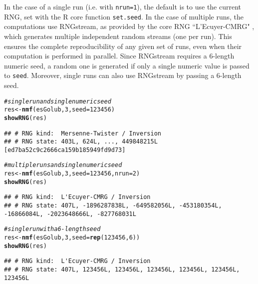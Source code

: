 \documentclass[a4paper]{article}\usepackage[]{graphicx}\usepackage[]{color}
\makeatletter
\newcommand{\hlnum}[1]{\textcolor[rgb]{0.686,0.059,0.569}{#1}}%
\newcommand{\hlcom}[1]{\textcolor[rgb]{0.678,0.584,0.686}{\textit{#1}}}%
\newcommand{\hlstd}[1]{\textcolor[rgb]{0.345,0.345,0.345}{#1}}%
\newcommand{\hlkwb}[1]{\textcolor[rgb]{0.69,0.353,0.396}{#1}}%
\newcommand{\hlkwc}[1]{\textcolor[rgb]{0.333,0.667,0.333}{#1}}%
\newcommand{\hlkwd}[1]{\textcolor[rgb]{0.737,0.353,0.396}{\textbf{#1}}}%
\newenvironment{kframe}{%
 \def\at@end@of@kframe{}%
 \ifinner\ifhmode%
  \def\at@end@of@kframe{\end{minipage}}%
  \begin{minipage}{\columnwidth}%
 \fi\fi%
 \def\FrameCommand##1{\hskip\@totalleftmargin \hskip-\fboxsep
 \colorbox{shadecolor}{##1}\hskip-\fboxsep
     \hskip-\linewidth \hskip-\@totalleftmargin \hskip\columnwidth}%
 \MakeFramed {\advance\hsize-\width
   \@totalleftmargin\z@ \linewidth\hsize
   \@setminipage}}%
 {\par\unskip\endMakeFramed%
 \at@end@of@kframe}
\newenvironment{knitrout}{}{} %
\let\code=\texttt
\renewcommand{\cite}[1]{\parencite{#1}}
\makeatother
\begin{document}
In the case of a single run (i.e. with \code{nrun=1}), the default is to use the current RNG, set with the R core function \code{set.seed}. 
In the case of multiple runs, the computations use RNGstream, as provided by the core RNG ``L'Ecuyer-CMRG" \cite{Lecuyer2002}, which generates multiple independent random streams (one per run).
This ensures the complete reproducibility of any given set of runs, even when their computation is performed in parallel.
Since RNGstream requires a 6-length numeric seed, a random one is generated if only a single numeric value is passed to \code{seed}.
Moreover, single runs can also use RNGstream by passing a 6-length seed.
  
\begin{knitrout}
\color{fgcolor}\begin{kframe}
\begin{alltt}
\hlcom{# single run and single numeric seed}
\hlstd{res} \hlkwb{<-} \hlkwd{nmf}\hlstd{(esGolub,} \hlnum{3}\hlstd{,} \hlkwc{seed} \hlstd{=} \hlnum{123456}\hlstd{)}
\hlkwd{showRNG}\hlstd{(res)}
\end{alltt}
\begin{verbatim}
## # RNG kind:  Mersenne-Twister / Inversion 
## # RNG state: 403L, 624L, ..., 449848215L [ed7ba52c9c2666ca159b185949fd9d73]
\end{verbatim}
\begin{alltt}
\hlcom{# multiple runs and single numeric seed}
\hlstd{res} \hlkwb{<-} \hlkwd{nmf}\hlstd{(esGolub,} \hlnum{3}\hlstd{,} \hlkwc{seed} \hlstd{=} \hlnum{123456}\hlstd{,} \hlkwc{nrun} \hlstd{=} \hlnum{2}\hlstd{)}
\hlkwd{showRNG}\hlstd{(res)}
\end{alltt}
\begin{verbatim}
## # RNG kind:  L'Ecuyer-CMRG / Inversion 
## # RNG state: 407L, -1896287838L, -649582056L, -453180354L, -16866084L, -2023648666L, -827768031L
\end{verbatim}
\begin{alltt}
\hlcom{# single run with a 6-length seed}
\hlstd{res} \hlkwb{<-} \hlkwd{nmf}\hlstd{(esGolub,} \hlnum{3}\hlstd{,} \hlkwc{seed} \hlstd{=} \hlkwd{rep}\hlstd{(}\hlnum{123456}\hlstd{,} \hlnum{6}\hlstd{))}
\hlkwd{showRNG}\hlstd{(res)}
\end{alltt}
\begin{verbatim}
## # RNG kind:  L'Ecuyer-CMRG / Inversion 
## # RNG state: 407L, 123456L, 123456L, 123456L, 123456L, 123456L, 123456L
\end{verbatim}
\end{kframe}
\end{knitrout}
\end{document}

